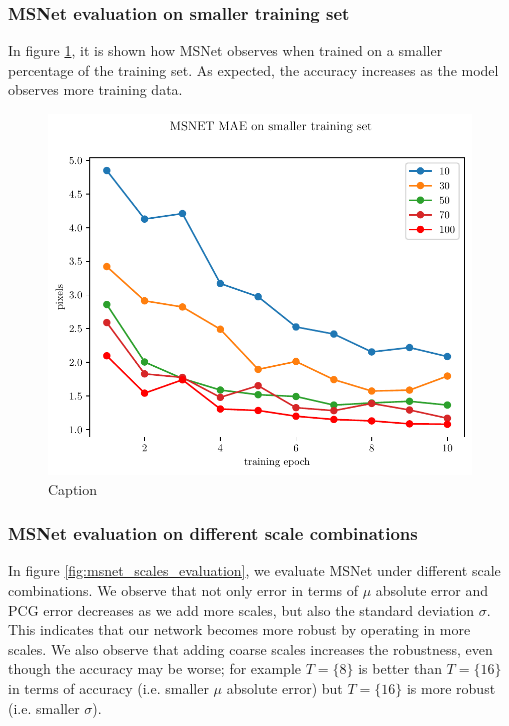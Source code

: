 \documentclass[10pt]{article}
\begin{document}
\subsubsection{MSNet evaluation on smaller training set}

In figure \ref{fig:msnet_smaller_tr_set}, it is shown how MSNet observes when trained on a smaller percentage of the training set. As expected, the accuracy increases as the model observes more training data.

\begin{figure}
    \centering
    \includegraphics[width=\textwidth]{paper/latex/figures/freiburg_msnet_mae_smaller_training_set.pdf}
    \caption{Caption}
    \label{fig:msnet_smaller_tr_set}
\end{figure}{}

\subsubsection{MSNet evaluation on different scale combinations}

In figure \ref{fig:msnet_scales_evaluation}, we evaluate MSNet under different scale combinations. We observe that not only error in terms of $\mu$ absolute error and PCG error decreases as we add more scales, but also the standard deviation $\sigma$. This indicates that our network becomes more robust by operating in more scales. We also observe that adding coarse scales increases the robustness, even though the accuracy may be worse; for example $T=\{ 8 \}$ is better than $ T = \{ 16 \}$ in terms of accuracy (i.e. smaller $\mu$ absolute error) but $ T = \{ 16 \}$ is more robust (i.e. smaller $\sigma$). 
\end{document}
